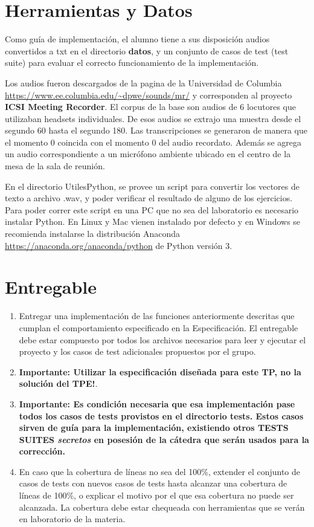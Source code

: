 \documentclass[a4paper]{article}
\begin{document}
\section{Herramientas y Datos}


Como guía de implementación, el alumno tiene a sus disposición audios convertidos a txt en el directorio \textbf{datos}, y un conjunto de casos de test (test suite) para evaluar el correcto funcionamiento de la implementación.

Los audios fueron descargados de la pagina de la Universidad de Columbia \url{https://www.ee.columbia.edu/~dpwe/sounds/mr/} y corresponden al proyecto \textbf{ICSI Meeting Recorder}.
El corpus de la base son audios de 6 locutores que utilizaban headsets individuales.
De esos audios se extrajo una muestra desde el segundo 60 hasta el segundo 180. Las transcripciones se generaron de manera que el momento 0 coincida con el momento 0 del audio recordato.
Además se agrega un audio correspondiente a un micrófono ambiente ubicado en el centro de la mesa de la sala de reunión.

En el directorio UtilesPython, se provee un script para convertir los vectores de texto a archivo .wav, y poder verificar el resultado de alguno de los ejercicios.
Para poder correr este script en una PC que no sea del laboratorio es necesario instalar Python. En Linux y Mac vienen instalado por defecto y en Windows se recomienda instalarse la distribución Anaconda \url{https://anaconda.org/anaconda/python} de Python versión 3.



\section{Entregable}

\begin{enumerate}
\item Entregar una implementación de las funciones anteriormente descritas que cumplan el comportamiento especificado en la Especificación.
El entregable debe estar compuesto por todos los archivos necesarios para leer y ejecutar el proyecto y los casos de test adicionales propuestos por el grupo.
\item \textbf{Importante: Utilizar la especificación dise\~nada para este TP, no la solución del TPE!}.
\item \textbf{Importante: Es condición necesaria que esa implementación pase todos los casos de tests provistos en el directorio \textbf{tests}. Estos casos sirven de guía para la implementación, existiendo otros TESTS SUITES \textit{secretos} en posesión de la cátedra que serán usados para la corrección.}
\item  En caso que la cobertura de líneas no sea del 100\%, extender el conjunto de casos de tests con nuevos casos de tests hasta alcanzar una cobertura de líneas de 100\%, o explicar el motivo por el que esa cobertura no puede ser alcanzada. La cobertura debe estar chequeada con  herramientas que se verán en laboratorio de la materia.
\end{enumerate}
\end{document}
